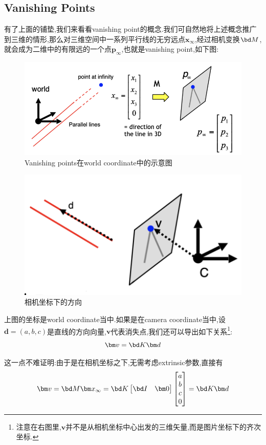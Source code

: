 \subsection{Vanishing Points}

有了上面的铺垫,我们来看看vanishing point的概念.我们可自然地将上述概念推广到三维的情形,那么对三维空间中一系列平行线的无穷远点$\bm x_\infty$,经过相机变换$\bd M$,就会成为二维中的有限远的一个点$\bm p_\infty$,也就是vanishing point,如下图:
\begin{figure}[htbp]
	\centering
	\includegraphics[scale=0.65]{figures/vanishingpoints.png}
	\caption{Vanishing points在world coordinate中的示意图}
	\label{}
\end{figure}

\begin{figure}
	\includegraphics[scale=0.5]{figures/vpanddir.png}
	\caption{相机坐标下的方向}
\end{figure}
上图的坐标是world coordinate当中.如果是在camera coordinate当中,设$\bm d = (a, b, c)$是直线的方向向量,$\bm v$代表消失点,我们还可以导出如下关系\footnote{注意在右图里,$\bm v$并不是从相机坐标中心出发的三维矢量,而是图片坐标下的齐次坐标.}:
\begin{equation}
	\bm v = \bd K \bm d
\end{equation}


这一点不难证明:由于是在相机坐标之下,无需考虑extrinsic参数,直接有
\begin{equation}
	\bm v = \bd M \bm x_\infty = \bd K 
	\begin{bmatrix}
		\bd I & \bm 0
	\end{bmatrix}
	\begin{bmatrix}
		a\\b\\c\\0
	\end{bmatrix} = \bd K \bm d
\end{equation}

